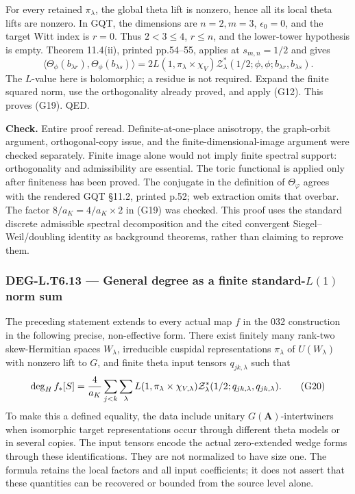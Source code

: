 For every retained \(\pi_\lambda\), the global theta lift is nonzero, hence all its local theta lifts are nonzero. In GQT, the dimensions are \(n=2,m=3\), \(\epsilon_0=0\), and the target Witt index is \(r=0\). Thus \(2<3\le4\), \(r\le n\), and the lower-tower hypothesis is empty. Theorem 11.4(ii), printed pp.54--55, applies at \(s_{m,n}=1/2\) and gives \[
\langle\Theta_\phi(b_{\lambda r}),\Theta_\phi(b_{\lambda s})\rangle
=2L(1,\pi_\lambda\times\chi_V)
\mathcal Z^*_{\lambda}(1/2;\phi,\phi;b_{\lambda r},b_{\lambda s}).
\] The \(L\)-value here is holomorphic; a residue is not required. Expand the finite squared norm, use the orthogonality already proved, and apply (G12). This proves (G19). QED.

\textbf{Check.} Entire proof reread. Definite-at-one-place anisotropy, the graph-orbit argument, orthogonal-copy issue, and the finite-dimensional-image argument were checked separately. Finite image alone would not imply finite spectral support: orthogonality and admissibility are essential. The toric functional is applied only after finiteness has been proved. The conjugate in the definition of \(\Theta_\varphi\) agrees with the rendered GQT §11.2, printed p.52; web extraction omits that overbar. The factor \(8/a_K=4/a_K\times2\) in (G19) was checked. This proof uses the standard discrete admissible spectral decomposition and the cited convergent Siegel--Weil/doubling identity as background theorems, rather than claiming to reprove them.

\subsubsection{\texorpdfstring{DEG-L.T6.13 --- General degree as a finite standard-\(L(1)\) norm sum}{DEG-L.T6.13 --- General degree as a finite standard-L(1) norm sum}}\label{DEG-L.T6.13}

The preceding statement extends to every actual map \(f\) in the 032 construction in the following precise, non-effective form. There exist finitely many rank-two skew-Hermitian spaces \(W_\lambda\), irreducible cuspidal representations \(\pi_\lambda\) of \(U(W_\lambda)\) with nonzero lift to \(G\), and finite theta input tensors \(q_{jk,\lambda}\) such that \[
\deg_H f_*[S]
={4\over a_K}\sum_{j<k}\sum_\lambda
 L(1,\pi_\lambda\times\chi_{V,\lambda})
 \mathcal Z^*_{\lambda}(1/2;q_{jk,\lambda},q_{jk,\lambda}).
\tag{G20}
\] To make this a defined equality, the data include unitary \(G(\mathbf A)\)-intertwiners when isomorphic target representations occur through different theta models or in several copies. The input tensors encode the actual zero-extended wedge forms through these identifications. They are not normalized to have size one. The formula retains the local factors and all input coefficients; it does not assert that these quantities can be recovered or bounded from the source level alone.

